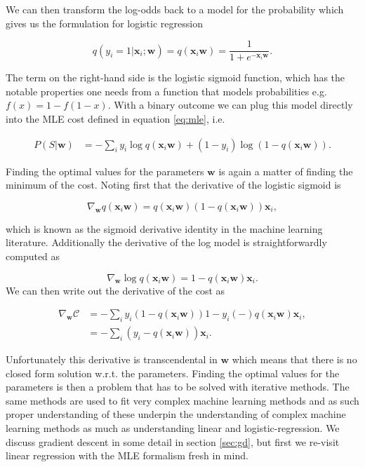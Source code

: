 We can then transform the log-odds back to a model for the probability which gives us the formulation for logistic regression 

\begin{equation}
q(y_i=1 | \mathbf{x}_i; \mathbf{w})= q(\mathbf{x}_i\mathbf{w}) = \frac{1}{1 + e^{-\mathbf{x}_i \mathbf{w}}}.
\end{equation} 

\noindent The term on the right-hand side is the logistic sigmoid function, which has the notable properties one needs from a function that models probabilities e.g. $f(x) = 1-f(1-x)$. With a binary outcome we can plug this model directly into the MLE cost defined in equation \ref{eq:mle}, i.e. 

\begin{align}\label{eq:mle_lr}
P(S|\mathbf{w}) &=  - \sum_i y_i\log q (\mathbf{x}_i\mathbf{w}) + (1-y_i)\log\left(1-q(\mathbf{x}_i\mathbf{w})\right).
\end{align}

\noindent Finding the optimal values for the parameters $\mathbf{w}$ is again a matter of finding the minimum of the cost. Noting first that the derivative of the logistic sigmoid is 

\begin{equation}
\nabla_{\mathbf{w}} q(\mathbf{x}_i \mathbf{w}) = q(\mathbf{x}_i \mathbf{w}) (1 - q(\mathbf{x}_i \mathbf{w}))\mathbf{x}_i,
\end{equation}

\noindent which is known as the sigmoid derivative identity in the machine learning literature. Additionally the derivative of the log model is straightforwardly computed as 

\begin{equation}
\nabla_\mathbf{w} \log q(\mathbf{x}_i \mathbf{w}) = 1- q(\mathbf{x}_i \mathbf{w})\mathbf{x}_i.
\end{equation}
 We can then write out the derivative of the cost as 

\begin{align}
\nabla_{\mathbf{w}} \mathcal{C} &= - \sum_i y_i (1 - q(\mathbf{x}_i \mathbf{w})) 1-y_i (-) q(\mathbf{x}_i \mathbf{w})\mathbf{x}_i, \\
&= - \sum_i \left(y_i -  q(\mathbf{x}_i \mathbf{w})\right)\mathbf{x}_i.
\end{align}

\noindent Unfortunately this derivative is transcendental in $\mathbf{w}$ which means that there is no closed form solution w.r.t. the parameters. Finding the optimal values for the parameters is then a problem that has to be solved with iterative methods. The same methods are used to fit very complex machine learning methods and as such proper understanding of these underpin the understanding of complex machine learning methods as much as understanding linear and logistic-regression. We discuss gradient descent in some detail in section \ref{sec:gd}, but first we re-visit linear regression with the MLE formalism fresh in mind.